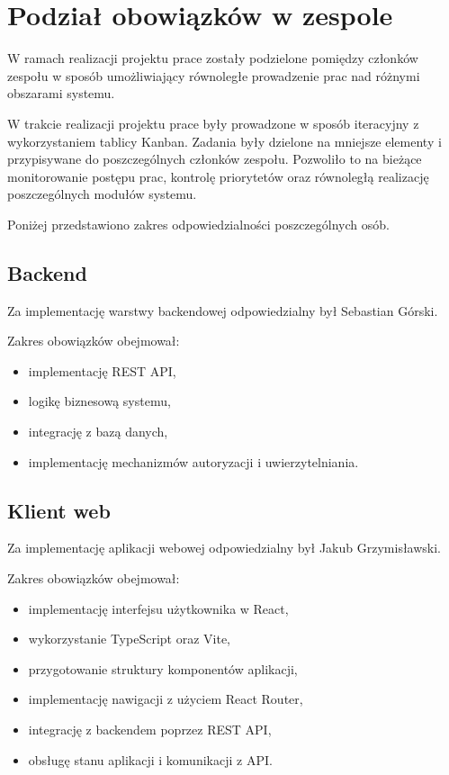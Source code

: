 \chapter{Podział obowiązków w zespole}

W ramach realizacji projektu prace zostały podzielone pomiędzy członków zespołu w sposób umożliwiający równoległe prowadzenie prac nad różnymi obszarami systemu.

W trakcie realizacji projektu prace były prowadzone w sposób iteracyjny z wykorzystaniem tablicy Kanban. Zadania były dzielone na mniejsze elementy i przypisywane do poszczególnych członków zespołu. Pozwoliło to na bieżące monitorowanie postępu prac, kontrolę priorytetów oraz równoległą realizację poszczególnych modułów systemu.

Poniżej przedstawiono zakres odpowiedzialności poszczególnych osób.

\section{Backend}

Za implementację warstwy backendowej odpowiedzialny był Sebastian Górski.

Zakres obowiązków obejmował:
\begin{itemize}
	\item implementację REST API,
	\item logikę biznesową systemu,
	\item integrację z bazą danych,
	\item implementację mechanizmów autoryzacji i uwierzytelniania.
\end{itemize}

\section{Klient web}

Za implementację aplikacji webowej odpowiedzialny był Jakub Grzymisławski.

Zakres obowiązków obejmował:
\begin{itemize}
	\item implementację interfejsu użytkownika w React,
	\item wykorzystanie TypeScript oraz Vite,
	\item przygotowanie struktury komponentów aplikacji,
	\item implementację nawigacji z użyciem React Router,
	\item integrację z backendem poprzez REST API,
	\item obsługę stanu aplikacji i komunikacji z API.
\end{itemize}

